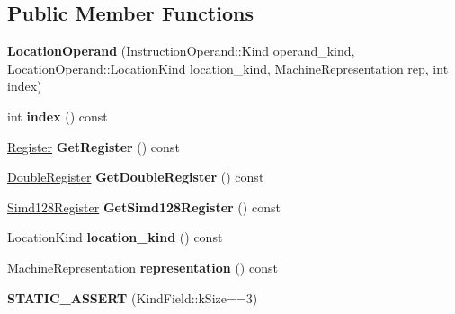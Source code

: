 \subsection*{Public Member Functions}
\begin{DoxyCompactItemize}
\item 
{\bfseries Location\+Operand} (Instruction\+Operand\+::\+Kind operand\+\_\+kind, Location\+Operand\+::\+Location\+Kind location\+\_\+kind, Machine\+Representation rep, int index)\hypertarget{classv8_1_1internal_1_1compiler_1_1_location_operand_a0122a8300b2c16ca73ee2f0929aec02b}{}\label{classv8_1_1internal_1_1compiler_1_1_location_operand_a0122a8300b2c16ca73ee2f0929aec02b}

\item 
int {\bfseries index} () const \hypertarget{classv8_1_1internal_1_1compiler_1_1_location_operand_aef9aeceea11f537ddd9d8bc11c3914d4}{}\label{classv8_1_1internal_1_1compiler_1_1_location_operand_aef9aeceea11f537ddd9d8bc11c3914d4}

\item 
\hyperlink{structv8_1_1internal_1_1_register}{Register} {\bfseries Get\+Register} () const \hypertarget{classv8_1_1internal_1_1compiler_1_1_location_operand_aa9842c714e43e0bb024beeafa4443102}{}\label{classv8_1_1internal_1_1compiler_1_1_location_operand_aa9842c714e43e0bb024beeafa4443102}

\item 
\hyperlink{structv8_1_1internal_1_1_double_register}{Double\+Register} {\bfseries Get\+Double\+Register} () const \hypertarget{classv8_1_1internal_1_1compiler_1_1_location_operand_af25a992764bc4e731f774b94f12765b7}{}\label{classv8_1_1internal_1_1compiler_1_1_location_operand_af25a992764bc4e731f774b94f12765b7}

\item 
\hyperlink{structv8_1_1internal_1_1_qw_neon_register}{Simd128\+Register} {\bfseries Get\+Simd128\+Register} () const \hypertarget{classv8_1_1internal_1_1compiler_1_1_location_operand_a307dc8f139a8003af4ce2f994e53a4d2}{}\label{classv8_1_1internal_1_1compiler_1_1_location_operand_a307dc8f139a8003af4ce2f994e53a4d2}

\item 
Location\+Kind {\bfseries location\+\_\+kind} () const \hypertarget{classv8_1_1internal_1_1compiler_1_1_location_operand_ac3356d910405eabaedb90051ebb66f6d}{}\label{classv8_1_1internal_1_1compiler_1_1_location_operand_ac3356d910405eabaedb90051ebb66f6d}

\item 
Machine\+Representation {\bfseries representation} () const \hypertarget{classv8_1_1internal_1_1compiler_1_1_location_operand_a9d3ac063f43e913a7971d9faa3523853}{}\label{classv8_1_1internal_1_1compiler_1_1_location_operand_a9d3ac063f43e913a7971d9faa3523853}

\item 
{\bfseries S\+T\+A\+T\+I\+C\+\_\+\+A\+S\+S\+E\+RT} (Kind\+Field\+::k\+Size==3)\hypertarget{classv8_1_1internal_1_1compiler_1_1_location_operand_a99e00c5db0d6fa6f488f82237cbcd199}{}\label{classv8_1_1internal_1_1compiler_1_1_location_operand_a99e00c5db0d6fa6f488f82237cbcd199}

\end{DoxyCompactItemize}
